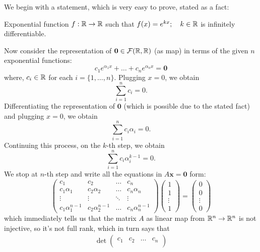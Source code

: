 \documentclass[11pt, a4paper, abstract=true]{scrartcl}
\begin{document}
\begin{soln}
    We begin with a statement, which is very easy to prove, stated as a fact:
    \begin{fact*}
        Exponential function \(f: \mathbb R \to \mathbb R\) such that \(f(x) = e^{kx}; \quad k \in \mathbb R\) is infinitely differentiable.
    \end{fact*}
    Now consider the representation of \(\mathbf{0} \in \mathcal{F}(\mathbb R, \mathbb R)\) (as map) in terms of the given \(n\) exponential functions:
    \begin{equation*}
        c_1e^{\alpha_1 x}+ \dots+ c_n e^{\alpha_n x} = \mathbf{0}
    \end{equation*}
    where, \(c_i \in \mathbb R\) for each \(i = \{1,\dots, n\}\). Plugging \(x = 0\), we obtain
    \[\sum_{i=1}^{n} c_i = 0.\]
    Differentiating the representation of \(\mathbf{0}\) (which is possible due to the stated fact) and plugging \(x = 0\), we obtain 
    \[\sum_{i=1}^{n} c_i \alpha_i = 0.\] Continuing this process, on the \(k\)-th step, we obtain \[\sum_{i=1}^{n} c_i \alpha_i^{k-1} = 0.\] We stop at \(n\)-th step and write all the equations in \(A\mathbf{x} = \mathbf{0}\) form: 
    \[
        \begin{pmatrix}
            c_1 & c_2 & \dots & c_n\\
            c_1\alpha_1 & c_2\alpha_2 & \dots & c_n\alpha_n\\
            \vdots & \vdots & \ddots & \vdots\\
            c_1\alpha_1^{n-1} & c_2\alpha_2^{n-1} & \dots & c_n\alpha_{n}^{n-1}
        \end{pmatrix}
        \begin{pmatrix}
            1\\
            1\\
            \vdots\\
            1
        \end{pmatrix}
        =
        \begin{pmatrix}
            0\\
            0\\
            \vdots\\
            0
        \end{pmatrix}
    \] which immediately tells us that the matrix \(A\) as linear map from \(\mathbb R^n \to \mathbb R^n\) is not injective, so it's not full rank, which in turn says that
    \begin{align*}
        \det
        \begin{pmatrix}
            c_1 & c_2 & \dots & c_n\\

\end{pmatrix}
\end{align*}
\end{soln}
\end{document}
